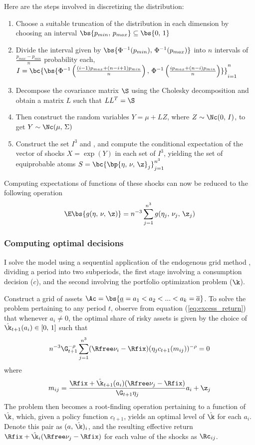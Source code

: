 Here are the steps involved in discretizing the distribution:
\begin{enumerate}
    \item Choose a suitable truncation of the distribution in each dimension by choosing an interval $\bs{p_{min},\,p_{max}} \subseteq \bs{0,\,1}$
    \item Divide the interval given by $\bs{\Phi^{-1}(p_{min}),\,\Phi^{-1}(p_{max})}$ into $n$ intervals of $\frac{p_{max} - p_{min}}{n}$ probability each, $I = \bc{\bs{\Phi^{-1}\left(\frac{(i - 1)p_{max} + (n - i + 1)p_{min}}{n}\right),\,\Phi^{-1}\left(\frac{ip_{max} + (n - i)p_{min}}{n}\right)}}_{i=1}^{n}$
    \item Decompose the covariance matrix $\S$ using the Cholesky decomposition and obtain a matrix $L$ such that $LL^T = \S$
    \item Then construct the random variables $Y = \mu + LZ$, where $Z \sim \Nc(0,\,I)$, to get $Y \sim \Nc(\mu,\,\Sigma)$
    \item Construct the set $I^3$ and , and compute the conditional expectation of the vector of shocks $X = \exp(Y)$ in each set of $I^3$, yielding the set of equiprobable atoms $S = \bc{\bp{\eta,\,\nu,\,\z}_{j}}_{j=1}^{n^3}$
\end{enumerate}

Computing expectations of functions of these shocks can now be reduced to the following operation
\[
\E\bs{g(\eta,\,\nu,\,\z)} = n^{-3}\sum_{j=1}^{n^3}g(\eta_j,\,\nu_j,\,\z_j)
\]

\subsubsection{Computing optimal decisions}

I solve the model using a sequential application of the endogenous grid method \citep{Carroll2006}, dividing a period into two subperiods, the first stage involving a consumption decision ($c$), and the second involving the portfolio optimization problem ($\k$).

Construct a grid of assets $\Ac = \bs{\underline{a} = a_1 < a_2 < ... < a_k = \overline{a}}$. To solve the problem pertaining to any period $t$, observe from equation (\ref{eq:excess_return}) that whenever $a_i \neq 0$, the optimal share of risky assets is given by the choice of $\hat{\k}_{t+1}(a_i) \in [0,\,1]$ such that
\begin{equation}\label{eq:kappa}
n^{-3}\G_{t+1}^{-\rho}\sum_{j=1}^{n^3}(\Rfree\nu_i - \Rfix)(\eta_{j}c_{t+1}(m_{ij}))^{-\rho} = 0
\end{equation}
where
\[
m_{ij} = \frac{\Rfix + \hat{\k}_{t+1}(a_i)(\Rfree\nu_j - \Rfix)}{\G_{t+1}\eta_{j}}a_i + \z_j
\]
The problem then becomes a root-finding operation pertaining to a function of $\hat{\k}$, which, given a policy function $c_{t+1}$, yields an optimal level of $\hat{\k}$ for each $a_i$. Denote this pair as $(a,\,\hat{\k})_{i}$, and the resulting effective return $\Rfix + \hat{\k}_{i}(\Rfree\nu_{j} - \Rfix)$ for each value of the shocks as $\Rc_{ij}$.

